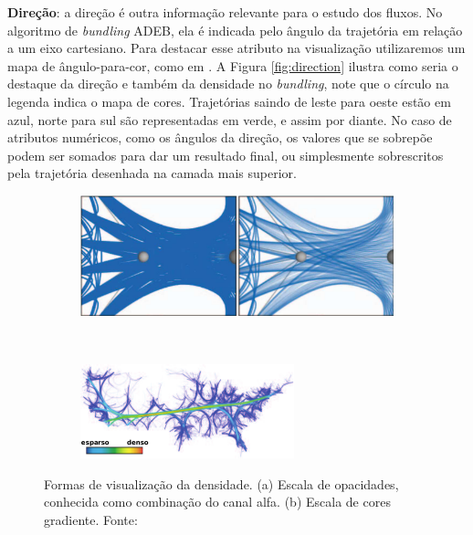 \textbf{Direção}: a direção é outra informação relevante para o estudo dos
fluxos.  No algoritmo de \emph{bundling} ADEB, ela é indicada pelo ângulo da
trajetória em relação a um eixo cartesiano. Para destacar esse atributo na
visualização utilizaremos um mapa de ângulo-para-cor, como em
\citet{ZegarraFlores2016}. A Figura \ref{fig:direction} ilustra como seria o
destaque da direção e também da densidade no \emph{bundling}, note que o círculo na
legenda indica o mapa de cores. Trajetórias saindo de leste para oeste estão em
azul, norte para sul são representadas em verde, e assim por diante. No caso de
atributos numéricos, como os ângulos da direção, os valores que se sobrepõe
podem ser somados para dar um resultado final, ou simplesmente sobrescritos
pela trajetória desenhada na camada mais superior.

\begin{figure}[ht!]
  \centering
  \begin{subfigure}[t]{\textwidth}
    \centering
    \includegraphics[width=.8\textwidth]{../figuras/alpha-blending.pdf}
  \end{subfigure}
  ~
  \begin{subfigure}[t]{\textwidth}
    \centering
    \includegraphics[width=.8\textwidth]{../figuras/color-density.pdf}
  \end{subfigure}

  \caption[Densidade dos \emph{bundlings} mapeada em escalas de cores e
  opacidade.]{Formas de visualização da densidade. (a) Escala de opacidades, conhecida como combinação do canal alfa. (b) Escala de cores gradiente.  Fonte: \citet{Lhuillier2017} \label{fig:density-mappings}}
\end{figure}


